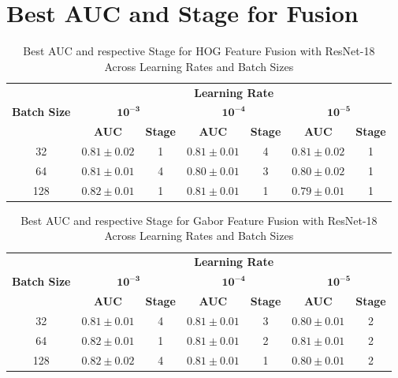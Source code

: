 
\chapter{Best AUC and Stage for Fusion} \label{ap1:Lorem}

\begin{table}[htbp]
  \centering
  \caption[Best AUC and Stage for HOG Fusion]{Best AUC and respective Stage for HOG Feature Fusion with ResNet-18 Across Learning Rates and Batch Sizes}
  \label{tab:hog_hyperparam}
  \begin{tabular}{@{} c *{3}{cc} @{}}
    \toprule
    & \multicolumn{6}{c}{\textbf{Learning Rate}} \\
    \cmidrule(lr){2-7}
    \textbf{Batch Size}
      & \multicolumn{2}{c}{\(\mathbf{10^{-3}}\)}
      & \multicolumn{2}{c}{\(\mathbf{10^{-4}}\)}
      & \multicolumn{2}{c}{\(\mathbf{10^{-5}}\)} \\
    \cmidrule(lr){2-3} \cmidrule(lr){4-5} \cmidrule(lr){6-7}
    & \textbf{AUC} & \textbf{Stage}
      & \textbf{AUC} & \textbf{Stage}
      & \textbf{AUC} & \textbf{Stage} \\
    \midrule
    32  
      & $0.81\pm0.02$ & 1 
      & \textbf{$0.81\pm0.01$} & 4 
      & \textbf{$0.81\pm0.02$} & 1 \\
    64  
      & $0.81\pm0.01$ & 4 
      & $0.80\pm0.01$ & 3 
      & $0.80\pm0.02$ & 1 \\
    128 
      & \textbf{$0.82\pm0.01$} & 1 
      & \textbf{$0.81\pm0.01$} & 1 
      & $0.79\pm0.01$ & 1 \\
    \bottomrule
  \end{tabular}
\end{table}

\begin{table}[htbp]
  \centering
  \caption[Best AUC and Stage for Gabor Fusion]{Best AUC and respective Stage for Gabor Feature Fusion with ResNet-18 Across Learning Rates and Batch Sizes}
  \label{tab:gabor_hyperparam}
  \begin{tabular}{@{} c *{3}{cc} @{}}
    \toprule
    & \multicolumn{6}{c}{\textbf{Learning Rate}} \\
    \cmidrule(lr){2-7}
    \textbf{Batch Size}
      & \multicolumn{2}{c}{\(\mathbf{10^{-3}}\)}
      & \multicolumn{2}{c}{\(\mathbf{10^{-4}}\)}
      & \multicolumn{2}{c}{\(\mathbf{10^{-5}}\)} \\
    \cmidrule(lr){2-3} \cmidrule(lr){4-5} \cmidrule(lr){6-7}
    & \textbf{AUC} & \textbf{Stage}
      & \textbf{AUC} & \textbf{Stage}
      & \textbf{AUC} & \textbf{Stage} \\
    \midrule
    32  
      & $0.81\pm0.01$ & 4 
      & \textbf{$0.81\pm0.01$} & 3
      & $0.80\pm0.01$ & 2 \\
    64  
      & \textbf{$0.82\pm0.01$} & 1 
      & \textbf{$0.81\pm0.01$} & 2 
      & \textbf{$0.81\pm0.01$} & 2 \\
    128 
      & $0.82\pm0.02$ & 4 
      & \textbf{$0.81\pm0.01$} & 1 
      & $0.80\pm0.01$ & 2 \\
    \bottomrule
  \end{tabular}
\end{table}

